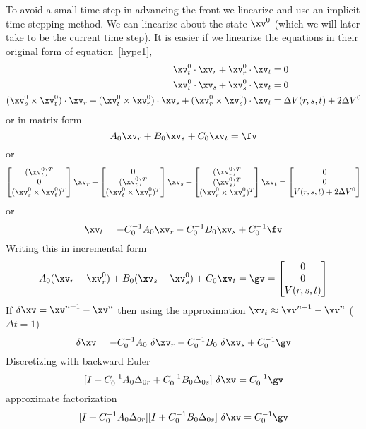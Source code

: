 To avoid a small time step in advancing the front we linearize and use an implicit time stepping method.
We can linearize about the state $\xv^0$ (which we will later take to be the current time step).
It is easier if we linearize the equations in their original form of equation~\ref{hype1},
\begin{align*}
    \xv_t^0 \cdot \xv_r + \xv_r^0 \cdot \xv_t & = 0 \\
   \xv_t^0 \cdot \xv_s + \xv_s^0 \cdot \xv_t & = 0 \\
  (\xv_s^0 \times \xv_t^0) \cdot \xv_r + (\xv_t^0 \times \xv_r^0) \cdot \xv_s +
         (\xv_r^0 \times \xv_s^0) \cdot \xv_t & = \Delta V(r,s,t) + 2\Delta V^0
\end{align*}  
or in matrix form
\[
   A_0 \xv_r + B_0 \xv_s + C_0 \xv_t = \fv 
\]
or
\[
\begin{bmatrix} (\xv_t^0)^T \\ 0 \\ (\xv_s^0 \times \xv_t^0)^T \end{bmatrix} \xv_r +
\begin{bmatrix} 0 \\  (\xv_t^0)^T \\ (\xv_t^0 \times \xv_r^0)^T \end{bmatrix} \xv_s +
\begin{bmatrix} (\xv_r^0)^T \\ (\xv_s^0)^T \\ (\xv_r^0 \times \xv_s^0)^T \end{bmatrix} \xv_t
= \begin{bmatrix} 0 \\ 0 \\ V(r,s,t) + 2\Delta V^0 \end{bmatrix}
\]
or
\[
   \xv_t= - C_0^{-1}A_0 \xv_r - C_0^{-1}B_0 \xv_s +  C_0^{-1}\fv
\]
Writing this in incremental form
\[
   A_0 (\xv_r-\xv_r^0) + B_0 (\xv_s-\xv_s^0) + C_0 \xv_t = \gv = \begin{bmatrix} 0 \\ 0 \\ V(r,s,t) \end{bmatrix}
\]
\newcommand{\dxv}{\delta\xv}
If $\dxv = \xv^{n+1} - \xv^n$ then using the approximation $\xv_t\approx\xv^{n+1} - \xv^n$ ($\Delta t=1$)
\[
   \dxv= - C_0^{-1}A_0 ~\dxv_r - C_0^{-1}B_0 ~\dxv_s +  C_0^{-1}\gv
\]
Discretizing with backward Euler
\[
   [ I + C_0^{-1}A_0 \Delta_{0r} + C_0^{-1}B_0 \Delta_{0s} ] ~\dxv = C_0^{-1}\gv
\]
approximate factorization
\[
   [ I + C_0^{-1}A_0 \Delta_{0r}][I + C_0^{-1}B_0 \Delta_{0s} ] ~\dxv = C_0^{-1}\gv 
\]
